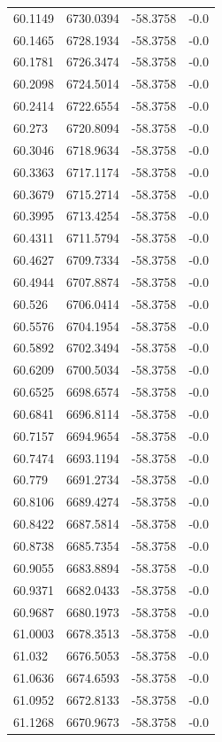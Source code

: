 \begin{table}[H]
\begin{tabular}{llll}
60.1149 & 6730.0394 & -58.3758 & -0.0 \\
60.1465 & 6728.1934 & -58.3758 & -0.0 \\
60.1781 & 6726.3474 & -58.3758 & -0.0 \\
60.2098 & 6724.5014 & -58.3758 & -0.0 \\
60.2414 & 6722.6554 & -58.3758 & -0.0 \\
60.273 & 6720.8094 & -58.3758 & -0.0 \\
60.3046 & 6718.9634 & -58.3758 & -0.0 \\
60.3363 & 6717.1174 & -58.3758 & -0.0 \\
60.3679 & 6715.2714 & -58.3758 & -0.0 \\
60.3995 & 6713.4254 & -58.3758 & -0.0 \\
60.4311 & 6711.5794 & -58.3758 & -0.0 \\
60.4627 & 6709.7334 & -58.3758 & -0.0 \\
60.4944 & 6707.8874 & -58.3758 & -0.0 \\
60.526 & 6706.0414 & -58.3758 & -0.0 \\
60.5576 & 6704.1954 & -58.3758 & -0.0 \\
60.5892 & 6702.3494 & -58.3758 & -0.0 \\
60.6209 & 6700.5034 & -58.3758 & -0.0 \\
60.6525 & 6698.6574 & -58.3758 & -0.0 \\
60.6841 & 6696.8114 & -58.3758 & -0.0 \\
60.7157 & 6694.9654 & -58.3758 & -0.0 \\
60.7474 & 6693.1194 & -58.3758 & -0.0 \\
60.779 & 6691.2734 & -58.3758 & -0.0 \\
60.8106 & 6689.4274 & -58.3758 & -0.0 \\
60.8422 & 6687.5814 & -58.3758 & -0.0 \\
60.8738 & 6685.7354 & -58.3758 & -0.0 \\
60.9055 & 6683.8894 & -58.3758 & -0.0 \\
60.9371 & 6682.0433 & -58.3758 & -0.0 \\
60.9687 & 6680.1973 & -58.3758 & -0.0 \\
61.0003 & 6678.3513 & -58.3758 & -0.0 \\
61.032 & 6676.5053 & -58.3758 & -0.0 \\
61.0636 & 6674.6593 & -58.3758 & -0.0 \\
61.0952 & 6672.8133 & -58.3758 & -0.0 \\
61.1268 & 6670.9673 & -58.3758 & -0.0 \\

\end{tabular}
\end{table}
